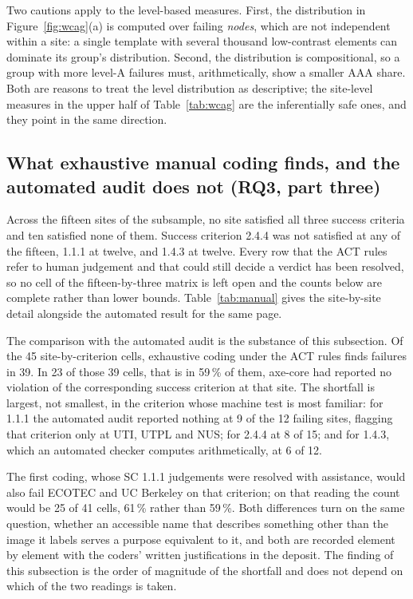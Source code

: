 \documentclass[]{interact}
\begin{document}
Two cautions apply to the level-based measures. First, the distribution in Figure~\ref{fig:wcag}(a) is computed over failing \emph{nodes}, which are not independent within a site: a single template with several thousand low-contrast elements can dominate its group's distribution. Second, the distribution is compositional, so a group with more level-A failures must, arithmetically, show a smaller AAA share. Both are reasons to treat the level distribution as descriptive; the site-level measures in the upper half of Table~\ref{tab:wcag} are the inferentially safe ones, and they point in the same direction.

\subsection{What exhaustive manual coding finds, and the automated audit does not (RQ3, part three)}\label{sec:results-manual}

Across the fifteen sites of the subsample, no site satisfied all three success criteria and ten satisfied none of them. Success criterion 2.4.4 was not satisfied at any of the fifteen, 1.1.1 at twelve, and 1.4.3 at twelve. Every row that the ACT rules refer to human judgement and that could still decide a verdict has been resolved, so no cell of the fifteen-by-three matrix is left open and the counts below are complete rather than lower bounds. Table~\ref{tab:manual} gives the site-by-site detail alongside the automated result for the same page.

The comparison with the automated audit is the substance of this subsection. Of the 45 site-by-criterion cells, exhaustive coding under the ACT rules finds failures in 39. In 23 of those 39 cells, that is in 59\,\% of them, axe-core had reported no violation of the corresponding success criterion at that site. The shortfall is largest, not smallest, in the criterion whose machine test is most familiar: for 1.1.1 the automated audit reported nothing at 9 of the 12 failing sites, flagging that criterion only at UTI, UTPL and NUS; for 2.4.4 at 8 of 15; and for 1.4.3, which an automated checker computes arithmetically, at 6 of 12.

The first coding, whose SC 1.1.1 judgements were resolved with assistance, would also fail ECOTEC and UC Berkeley on that criterion; on that reading the count would be 25 of 41 cells, 61\,\% rather than 59\,\%. Both differences turn on the same question, whether an accessible name that describes something other than the image it labels serves a purpose equivalent to it, and both are recorded element by element with the coders' written justifications in the deposit. The finding of this subsection is the order of magnitude of the shortfall and does not depend on which of the two readings is taken.
\end{document}
